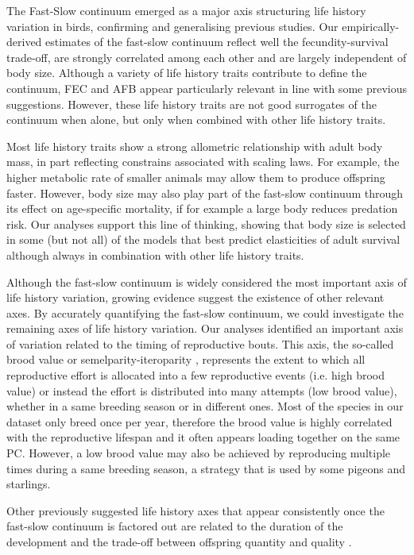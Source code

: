 The Fast-Slow continuum emerged as a major axis structuring life history 
variation in birds, confirming and generalising previous studies. Our 
empirically-derived estimates of the fast-slow continuum reflect well the 
fecundity-survival trade-off, are strongly correlated among each other and are 
largely independent of body size. Although a variety of life history traits 
contribute to define the continuum, FEC and AFB appear particularly relevant in
line with some previous suggestions. However, these life history traits are not
good surrogates of the continuum when alone, but only when combined with other
life history traits.

Most life history traits show a strong allometric relationship with adult body 
mass, in part reflecting constrains associated with scaling laws. For example, 
the higher metabolic rate of smaller animals may allow them to produce offspring 
faster. However, body size may also play part of the fast-slow continuum through 
its effect on age-specific mortality, if for example a large body reduces 
predation risk. Our analyses support this line of thinking, showing that body 
size is selected in some (but not all) of the models that best predict 
elasticities of adult survival although always in combination with other life 
history traits.

Although the fast-slow continuum is widely considered the most important axis of 
life history variation, growing evidence suggest the existence of other relevant 
axes. By accurately quantifying the fast-slow continuum, we could investigate 
the remaining axes of life history variation.
Our analyses identified an important axis of variation related to the timing of
reproductive bouts. This axis, the so-called brood value \citep{Bokony2009} or
semelparity-iteroparity \citep{Gaillard1989}, represents the extent to which
all reproductive effort is allocated into a few reproductive events (i.e. high
brood value) or instead the effort is distributed into many attempts (low brood
value), whether in a same breeding season or in different ones. Most of the
species in our dataset only breed once per year, therefore the brood value is
highly correlated with the reproductive lifespan and it often appears loading
together on the same PC. However, a low brood value may also be achieved by
reproducing multiple times during a same breeding season, a strategy that is
used by some pigeons and starlings.

Other previously suggested life history axes that appear consistently
once the fast-slow continuum is factored out are related to the duration of the
development and the trade-off between offspring quantity and quality
\citep{Promislow1990,Bielby2007,Dobson2007}.

